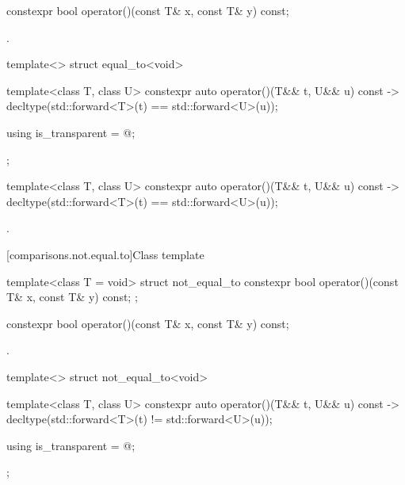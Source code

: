 %
\begin{itemdecl}
constexpr bool operator()(const T& x, const T& y) const;
\end{itemdecl}

\begin{itemdescr}
\pnum
\returns
{}.
\end{itemdescr}

%
\begin{itemdecl}
template<> struct equal_to<void> {
  template<class T, class U> constexpr auto operator()(T&& t, U&& u) const
    -> decltype(std::forward<T>(t) == std::forward<U>(u));

  using is_transparent = @\unspec@;
};
\end{itemdecl}

%
\begin{itemdecl}
template<class T, class U> constexpr auto operator()(T&& t, U&& u) const
    -> decltype(std::forward<T>(t) == std::forward<U>(u));
\end{itemdecl}

\begin{itemdescr}
\pnum
\returns
{}.
\end{itemdescr}

[comparisons.not.equal.to]{Class template }

%
\begin{itemdecl}
template<class T = void> struct not_equal_to {
  constexpr bool operator()(const T& x, const T& y) const;
};
\end{itemdecl}

%
\begin{itemdecl}
constexpr bool operator()(const T& x, const T& y) const;
\end{itemdecl}

\begin{itemdescr}
\pnum
\returns
{}.
\end{itemdescr}

%
\begin{itemdecl}
template<> struct not_equal_to<void> {
  template<class T, class U> constexpr auto operator()(T&& t, U&& u) const
    -> decltype(std::forward<T>(t) != std::forward<U>(u));

  using is_transparent = @\unspec@;
};
\end{itemdecl}

